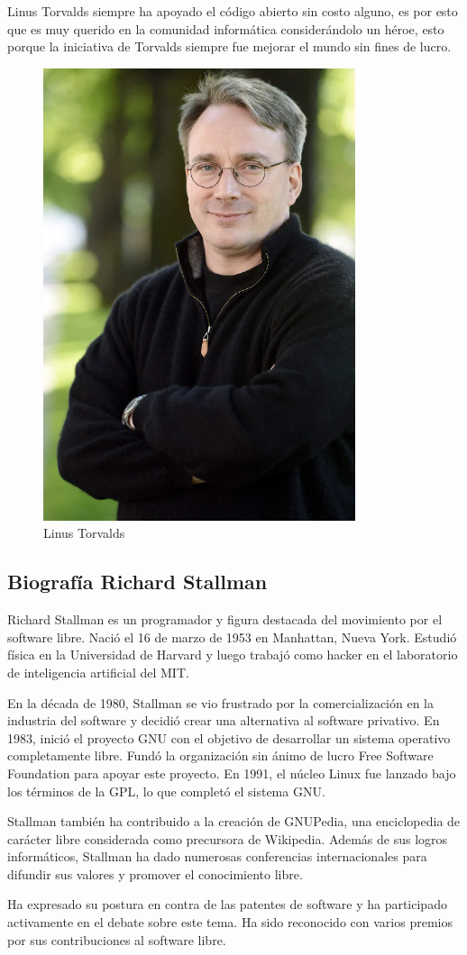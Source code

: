 \documentclass[11pt,twoside]{book}
\begin{document}
\vspace{5pt}
Linus Torvalds siempre ha apoyado el código abierto sin costo alguno, es por esto que es muy querido en la comunidad informática considerándolo un héroe, esto porque la iniciativa de Torvalds siempre fue mejorar el mundo sin fines de lucro.

\begin{figure}[htb]
  \centering
  \includegraphics[width=0.2\linewidth, height=0.2\textheight]{L.T.png}
  \caption{Linus Torvalds}
  \label{fig:etiqueta}
\end{figure}
\vspace{5pt}

\subsection{{\bfseries Biografía Richard Stallman}} 
Richard Stallman es un programador y figura destacada del movimiento por el software libre. Nació el 16 de marzo de 1953 en Manhattan, Nueva York. Estudió física en la Universidad de Harvard y luego trabajó como hacker en el laboratorio de inteligencia artificial del MIT.

\vspace{5pt}
En la década de 1980, Stallman se vio frustrado por la comercialización en la industria del software y decidió crear una alternativa al software privativo. En 1983, inició el proyecto GNU con el objetivo de desarrollar un sistema operativo completamente libre. Fundó la organización sin ánimo de lucro Free Software Foundation para apoyar este proyecto. En 1991, el núcleo Linux fue lanzado bajo los términos de la GPL, lo que completó el sistema GNU.

\vspace{5pt}
Stallman también ha contribuido a la creación de GNUPedia, una enciclopedia de carácter libre considerada como precursora de Wikipedia. Además de sus logros informáticos, Stallman ha dado numerosas conferencias internacionales para difundir sus valores y promover el conocimiento libre.

\vspace{5pt}
Ha expresado su postura en contra de las patentes de software y ha participado activamente en el debate sobre este tema. Ha sido reconocido con varios premios por sus contribuciones al software libre.
\end{document}
